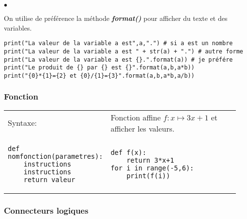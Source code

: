 \documentclass[10pt,dvipsnames,  dvips]{article}
\begin{document}
\begin{list}{$\bullet$}{}
\item On utilise de préférence la méthode \textbf{\textit{format()}} pour afficher du texte et des variables.
\end{list}

\lstset{ style=PYTHON}
\begin{lstlisting}
print("La valeur de la variable a est",a,".") # si a est un nombre
print("La valeur de la variable a est " + str(a) + ".") # autre forme
print("La valeur de la variable a est {}.".format(a)) # je préfére
print("Le produit de {} par {} est {}".format(a,b,a*b))
print("{0}*{1}={2} et {0}/{1}={3}".format(a,b,a*b,a/b))
\end{lstlisting}


\subsubsection*{Fonction}
\begin{tabular}[]{>{\raggedright}m{0.35\linewidth} >{\raggedright}m{0.6\linewidth}}
Syntaxe: & 
Fonction affine $f:x\longmapsto 3x+1$
et afficher les valeurs.  \tabularnewline %
\begin{lstlisting}
def nomfonction(parametres):
	instructions
	instructions
	return valeur
\end{lstlisting}
 & 
 \lstset{title={},caption={}, style=PYTHON}
\begin{lstlisting}
def f(x):
	return 3*x+1
for i in range(-5,6):
	print(f(i))
\end{lstlisting}
\end{tabular} 





\subsubsection*{Connecteurs logiques}
\end{document}
